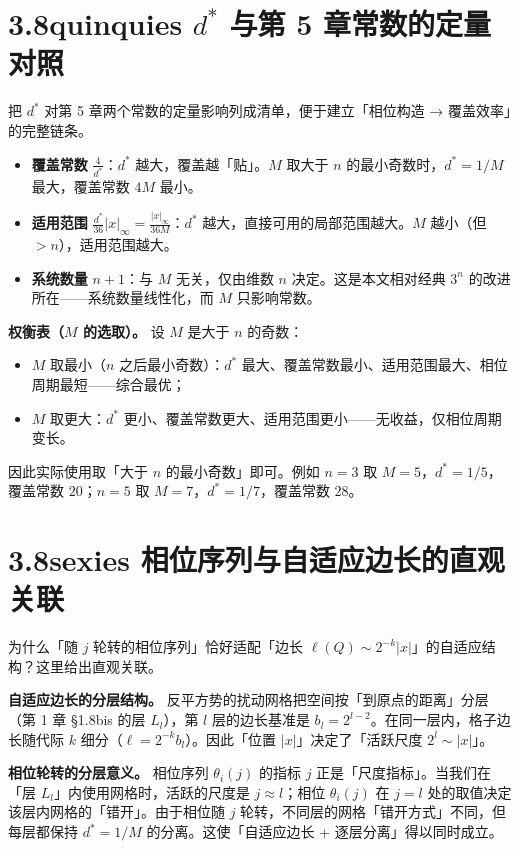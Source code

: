 \documentclass[a4paper,11pt,openany]{ctexbook}
\numberwithin{equation}{chapter}
\numberwithin{figure}{chapter}
\numberwithin{table}{chapter}
\begin{document}
\section{3.8quinquies $d^*$ 与第 5 章常数的定量对照}

把 $d^*$ 对第 5 章两个常数的定量影响列成清单，便于建立「相位构造 → 覆盖效率」的完整链条。

\begin{itemize}
\item \textbf{覆盖常数} $\frac4{d^*}$：$d^*$ 越大，覆盖越「贴」。$M$ 取大于 $n$ 的最小奇数时，$d^*=1/M$ 最大，覆盖常数 $4M$ 最小。
\item \textbf{适用范围} $\frac{d^*}{36}|x|_\infty=\frac{|x|_\infty}{36M}$：$d^*$ 越大，直接可用的局部范围越大。$M$ 越小（但 $>n$），适用范围越大。
\item \textbf{系统数量} $n+1$：与 $M$ 无关，仅由维数 $n$ 决定。这是本文相对经典 $3^n$ 的改进所在——系统数量线性化，而 $M$ 只影响常数。
\end{itemize}

\textbf{权衡表（$M$ 的选取）。} 设 $M$ 是大于 $n$ 的奇数：

\begin{itemize}
\item $M$ 取最小（$n$ 之后最小奇数）：$d^*$ 最大、覆盖常数最小、适用范围最大、相位周期最短——综合最优；
\item $M$ 取更大：$d^*$ 更小、覆盖常数更大、适用范围更小——无收益，仅相位周期变长。
\end{itemize}

因此实际使用取「大于 $n$ 的最小奇数」即可。例如 $n=3$ 取 $M=5$，$d^*=1/5$，覆盖常数 $20$；$n=5$ 取 $M=7$，$d^*=1/7$，覆盖常数 $28$。

\section{3.8sexies 相位序列与自适应边长的直观关联}

为什么「随 $j$ 轮转的相位序列」恰好适配「边长 $\ell(Q)\sim2^{-k}|x|$」的自适应结构？这里给出直观关联。

\textbf{自适应边长的分层结构。} 反平方势的扰动网格把空间按「到原点的距离」分层（第 1 章 §1.8bis 的层 $L_l$），第 $l$ 层的边长基准是 $b_l=2^{l-2}$。在同一层内，格子边长随代际 $k$ 细分（$\ell=2^{-k}b_l$）。因此「位置 $|x|$」决定了「活跃尺度 $2^l\sim|x|$」。

\textbf{相位轮转的分层意义。} 相位序列 $\theta_i(j)$ 的指标 $j$ 正是「尺度指标」。当我们在「层 $L_l$」内使用网格时，活跃的尺度是 $j\approx l$；相位 $\theta_i(j)$ 在 $j=l$ 处的取值决定该层内网格的「错开」。由于相位随 $j$ 轮转，不同层的网格「错开方式」不同，但每层都保持 $d^*=1/M$ 的分离。这使「自适应边长 + 逐层分离」得以同时成立。
\end{document}
